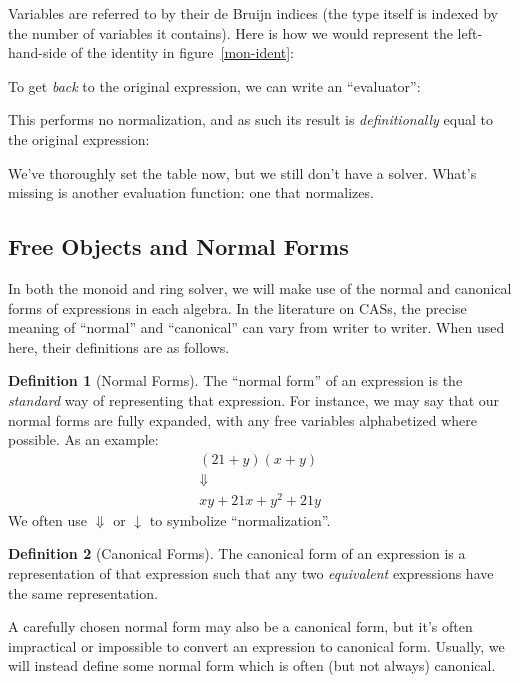 \documentclass[draft, twocolumn]{article}
\theoremstyle{definition}
\newtheorem{definition}{Definition}[section]
\theoremstyle{definition}
\begin{document}
Variables are referred to by their de Bruijn indices (the type itself is indexed
by the number of variables it contains). Here is how we would represent the
left-hand-side of the identity in figure~\ref{mon-ident}:
\begin{center}
\end{center}

To get \emph{back} to the original expression, we can write an ``evaluator'':

This performs no normalization, and as such its result is \emph{definitionally}
equal to the original expression\footnotemark:

We've thoroughly set the table now, but we still don't have a solver. What's
missing is another evaluation function: one that normalizes.
\subsection{Free Objects and Normal Forms}
In both the monoid and ring solver, we will make use of the normal and canonical
forms of expressions in each algebra. In the literature on CASs, the precise
meaning of ``normal'' and ``canonical'' can vary from writer to writer. When
used here, their definitions are as follows.
\begin{definition}[Normal Forms]
  The ``normal form'' of an expression is the \emph{standard} way of
  representing that expression. For instance, we may say that our normal forms
  are fully expanded, with any free variables alphabetized where possible. As an
  example:
  \begin{equation}
  \begin{gathered}
    (21 + y)(x + y) \\
    \Downarrow \\
    xy + 21x + y^2 + 21y
  \end{gathered}
  \end{equation}
  We often use \(\Downarrow\) or \(\downarrow\) to symbolize ``normalization''.
\end{definition}
\begin{definition}[Canonical Forms]
  The canonical form of an expression is a representation of that expression such
  that any two \emph{equivalent} expressions have the same representation.
\end{definition}
A carefully chosen normal form may also be a canonical form, but it's often
impractical or impossible to convert an expression to canonical form. Usually,
we will instead define some normal form which is often (but not always)
canonical.
\end{document}
